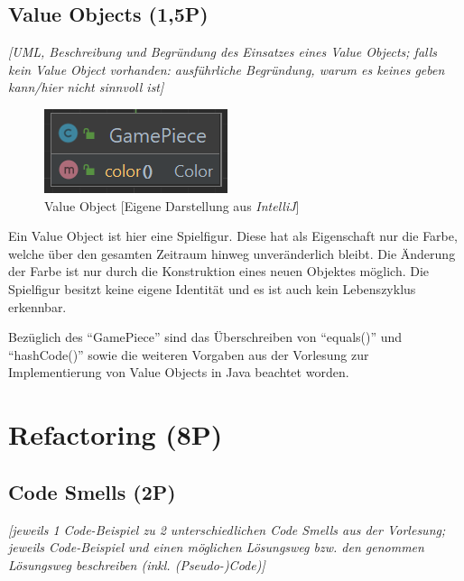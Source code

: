 \section{Value Objects (1,5P)}
\emph{[UML, Beschreibung und Begründung des Einsatzes eines Value Objects; falls kein Value Object
vorhanden: ausführliche Begründung, warum es keines geben kann/hier nicht sinnvoll ist]}

\begin{figure}[htbp]
\centering
\centerline{\includegraphics[scale=.6]{valueobject}}
\caption{Value Object [Eigene Darstellung aus \emph{IntelliJ}]}
\label{fig:valueobject}
\end{figure}

\noindent Ein Value Object ist hier eine Spielfigur. Diese hat als Eigenschaft nur die Farbe, welche über den gesamten Zeitraum hinweg unveränderlich bleibt. Die Änderung der Farbe ist nur durch die Konstruktion eines neuen Objektes möglich. Die Spielfigur besitzt keine eigene Identität und es ist auch kein Lebenszyklus erkennbar.

Bezüglich des \enquote{GamePiece} sind das Überschreiben von \enquote{equals()} und \enquote{hashCode()} sowie die weiteren Vorgaben aus der Vorlesung zur Implementierung von Value Objects in Java beachtet worden.

\newpage
\titlespacing*{\chapter}{0pt}{-30mm}{10pt}
  
\chapter{Refactoring (8P)}
\pagestyle{scrheadings}
\clearscrheadfoot
{}
\setcounter{page}{7}
\ofoot[\pagemark]{\pagemark}
\onehalfspacing

\section{Code Smells (2P)}
\emph{[jeweils 1 Code-Beispiel zu 2 unterschiedlichen Code Smells aus der Vorlesung; jeweils Code-Beispiel
und einen möglichen Lösungsweg bzw. den genommen Lösungsweg beschreiben (inkl. (Pseudo-)Code)]}

